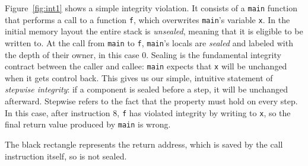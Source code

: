 \documentclass[acmsmall,review,anonymous]{acmart}\settopmatter{printfolios=true,printccs=false,printacmref=false}
\begin{document}
Figure~\ref{fig:int1} shows a simple integrity violation. It consists of a {\tt main}
function that performs a call to a function {\tt f}, which overwrites {\tt main}'s
variable {\tt x}. In the initial memory layout the entire stack is {\em unsealed},
meaning that it is eligible to be written to. At the call from {\tt main} to
{\tt f}, {\tt main}'s locals are {\em sealed} and labeled with the depth of
their owner,
in this case 0. Sealing is the fundamental integrity contract between the caller and callee:
{\tt main} expects that {\tt x} will be unchanged when it gets control back.
This gives us our simple, intuitive statement of {\em stepwise integrity}:
if a component is sealed before a step, it will be unchanged afterward. Stepwise
refers to the fact that the property must hold on every step. %
In this case, after instruction 8, {\tt f} has violated integrity by writing to {\tt x},
so the final return value produced by {\tt main} is wrong.

The black rectangle represents the return address, which is saved by the call
instruction itself, so is not sealed.
\end{document}
